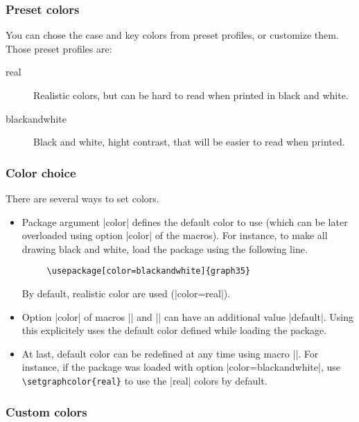 \documentclass{ltxdoc}
\begin{document}
 \subsubsection{Preset colors}

 You can chose the case and key colors from preset profiles, or customize them. Those preset profiles are:
 \begin{description}
 \item[real]  Realistic colors, but can be hard to read when printed in black and white.
 \item[blackandwhite]  Black and white, hight contrast, that will be easier to read when printed.
 \end{description}

 \subsubsection{Color choice}

 There are several ways to set colors.

 \begin{itemize}
   \item Package argument |color| defines the default color to use (which can be later overloaded using option |color| of the macros). For instance, to make all drawing black and white, load the package using the following line.

     \begin{lstlisting}
     \usepackage[color=blackandwhite]{graph35}
     \end{lstlisting}

     By default, realistic color are used (|color=real|).
   \item Option |color| of macros |\key| and |\calculator| can have an additional value |default|. Using this explicitely uses the default color defined while loading the package.
 \item
 \DescribeMacro{\setgraphcolor}
 At last, default color can be redefined at any time using macro |\setgraphcolor|. For instance, if the package was loaded with option |color=blackandwhite|, use \lstinline|\setgraphcolor{real}| to use the |real| colors by default.
 \end{itemize}

 \subsubsection{Custom colors}
\end{document}

